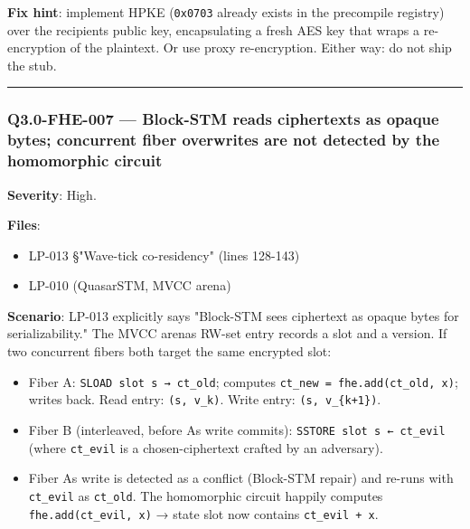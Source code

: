 \documentclass[
]{article}
\providecommand{\tightlist}{%
  \setlength{\itemsep}{0pt}\setlength{\parskip}{0pt}}
\begin{document}
\textbf{Fix hint}: implement HPKE (\texttt{0x0703} already exists in the
precompile registry) over the recipient\textquotesingle s public key,
encapsulating a fresh AES key that wraps a re-encryption of the
plaintext. Or use proxy re-encryption. Either way: do not ship the stub.

\begin{center}\rule{0.5\linewidth}{0.5pt}\end{center}

\subsubsection{Q3.0-FHE-007 --- Block-STM reads ciphertexts as opaque
bytes; concurrent fiber overwrites are not detected by the homomorphic
circuit}\label{q30-fhe-007--block-stm-reads-ciphertexts-as-opaque-bytes-concurrent-fiber-overwrites-are-not-detected-by-the-homomorphic-circuit}

\textbf{Severity}: High.

\textbf{Files}:

\begin{itemize}
\tightlist
\item
  LP-013 §"Wave-tick co-residency" (lines 128-143)
\item
  LP-010 (QuasarSTM, MVCC arena)
\end{itemize}

\textbf{Scenario}: LP-013 explicitly says "Block-STM sees ciphertext as
opaque bytes for serializability." The MVCC arena\textquotesingle s
RW-set entry records a slot and a version. If two concurrent fibers both
target the same encrypted slot:

\begin{itemize}
\tightlist
\item
  Fiber A: \texttt{SLOAD\ slot\ s\ →\ ct\_old}; computes
  \texttt{ct\_new\ =\ fhe.add(ct\_old,\ x)}; writes back. Read entry:
  \texttt{(s,\ v\_k)}. Write entry: \texttt{(s,\ v\_\{k+1\})}.
\item
  Fiber B (interleaved, before A\textquotesingle s write commits):
  \texttt{SSTORE\ slot\ s\ ←\ ct\_evil} (where \texttt{ct\_evil} is a
  chosen-ciphertext crafted by an adversary).
\item
  Fiber A\textquotesingle s write is detected as a conflict (Block-STM
  repair) and re-runs with \texttt{ct\_evil} as \texttt{ct\_old}. The
  homomorphic circuit happily computes \texttt{fhe.add(ct\_evil,\ x)} →
  state slot now contains \texttt{ct\_evil\ +\ x}.
\end{itemize}
\end{document}
